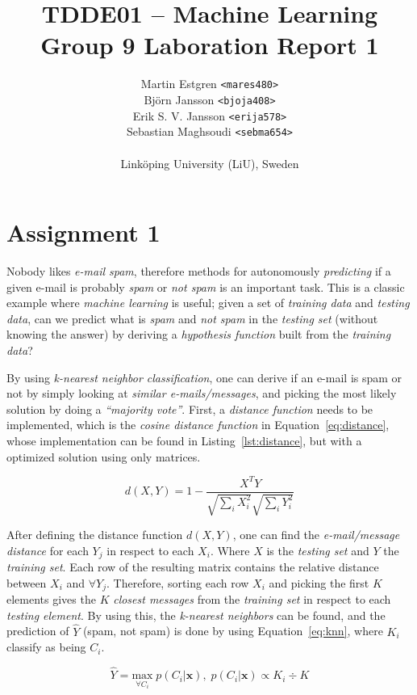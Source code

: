 \documentclass[a4paper, twocolumn]{article}
\title{TDDE01 -- Machine Learning \\
       Group 9 Laboration Report 1}
\author{{Martin Estgren \texttt{<mares480>}} \\
        {Björn Jansson \texttt{<bjoja408>}} \\
        {Erik S. V. Jansson \texttt{<erija578>}} \\
        {Sebastian Maghsoudi \texttt{<sebma654>}} \\~\\
        {Linköping University (LiU), Sweden}}
\begin{document}
    \maketitle %

    \section*{Assignment 1}

    Nobody likes \emph{e-mail spam}, therefore methods for autonomously \emph{predicting} if a given e-mail is probably \emph{spam} or \emph{not spam} is an important task. This is a classic example where \emph{machine learning} is useful; given a set of \emph{training data} and \emph{testing data}, can we predict what is \emph{spam} and \emph{not spam} in the \emph{testing set} (without knowing the answer) by deriving a \emph{hypothesis function} built from the \emph{training data}?

    By using \emph{k-nearest neighbor classification}, one can derive if an e-mail is spam or not by simply looking at \emph{similar e-mails/messages}, and picking the most likely solution by doing a \emph{``majority vote''}. First, a \emph{distance function} needs to be implemented, which is the \emph{cosine distance function} in Equation~\ref{eq:distance}, whose implementation can be found in Listing~\ref{lst:distance}, but with a optimized solution using only matrices.

    \begin{equation} \label{eq:distance}
        d(X,Y) = 1 - \frac{X^TY}{\sqrt{\sum_i{X_i^2}}\sqrt{\sum_i{Y_i^2}}}
    \end{equation}

    After defining the distance function $d(X,Y)$, one can find the \emph{e-mail/message distance} for each $Y_j$ in respect to each $X_i$. Where $X$ is the \emph{testing set} and $Y$ the \emph{training set}. Each row of the resulting matrix contains the relative distance between $X_i$ and $\forall Y_j$. Therefore, sorting each row $X_i$ and picking the first $K$ elements gives the $K$ \emph{closest messages} from the \emph{training set} in respect to each \emph{testing element}. By using this, the \emph{k-nearest neighbors} can be found, and the prediction of $\hat{Y}$ (spam, not spam) is done by using Equation~\ref{eq:knn}, where $K_i$ classify as being $C_i$.

    \begin{equation} \label{eq:knn}
        \hat{Y} = \underset{\forall C_i}{\mathrm{max}}\; p(C_i | \bm{x}),\; p(C_i | \bm{x}) \propto K_i \div K
    \end{equation}
\end{document}
